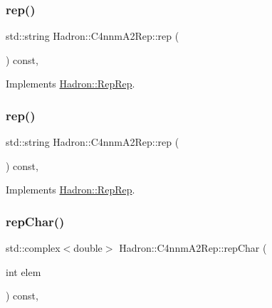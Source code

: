 \subsubsection{\texorpdfstring{rep()}{rep()}\hspace{0.1cm}{\footnotesize\ttfamily [2/3]}}
{\footnotesize\ttfamily std\+::string Hadron\+::\+C4nnm\+A2\+Rep\+::rep (\begin{DoxyParamCaption}{ }\end{DoxyParamCaption}) const\hspace{0.3cm}{\ttfamily [inline]}, {\ttfamily [virtual]}}



Implements \mbox{\hyperlink{structHadron_1_1RepRep_ab3213025f6de249f7095892109575fde}{Hadron\+::\+Rep\+Rep}}.

\mbox{\label{structHadron_1_1C4nnmA2Rep_a087273219d3b72971b2891ff00719c5a}} 
\subsubsection{\texorpdfstring{rep()}{rep()}\hspace{0.1cm}{\footnotesize\ttfamily [3/3]}}
{\footnotesize\ttfamily std\+::string Hadron\+::\+C4nnm\+A2\+Rep\+::rep (\begin{DoxyParamCaption}{ }\end{DoxyParamCaption}) const\hspace{0.3cm}{\ttfamily [inline]}, {\ttfamily [virtual]}}



Implements \mbox{\hyperlink{structHadron_1_1RepRep_ab3213025f6de249f7095892109575fde}{Hadron\+::\+Rep\+Rep}}.

\mbox{\label{structHadron_1_1C4nnmA2Rep_afb88da7160e06ad4085c5ed34d410bbc}} 
\subsubsection{\texorpdfstring{repChar()}{repChar()}\hspace{0.1cm}{\footnotesize\ttfamily [1/2]}}
{\footnotesize\ttfamily std\+::complex$<$double$>$ Hadron\+::\+C4nnm\+A2\+Rep\+::rep\+Char (\begin{DoxyParamCaption}\item[{int}]{elem }\end{DoxyParamCaption}) const\hspace{0.3cm}{\ttfamily [inline]}, {\ttfamily [virtual]}}




